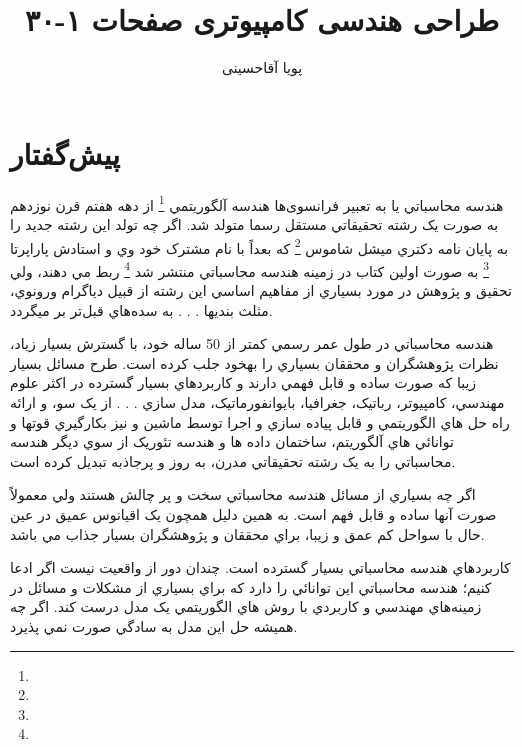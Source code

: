 \documentclass{book}
\author{پویا آقاحسینی}
\title{طراحی هندسی کامپیوتری صفحات ۱-۳۰}
\begin{document}
	\maketitle
	\tableofcontents
	\listoffigures
	\listoftables
	\chapter*{پیش‌گفتار}
	\begin{flushright}
		
		هندسه محاسباتي يا به تعبير فرانسوی‌ها هندسه آلگوريتمي 
		\footnote{}
		از دهه هفتم قرن نوزدهم به صورت يک رشته تحقيقاتي مستقل رسما متولد شد. اگر چه تولد اين رشته جديد را به پايان نامه دکتري ميشل شاموس
		\footnote{}
		که بعداً با نام مشترک خود وي و
		استادش پاراپرتا
		\footnote{}
		به صورت اولين کتاب در زمينه هندسه محاسباتي منتشر شد
		\footnote{}
		ربط مي دهند، ولي تحقيق و پژوهش در مورد
		بسياري از مفاهيم اساسي اين رشته از قبيل دياگرام ورونوي، مثلث بنديها . . . به سده‌هاي قبل‌تر بر ميگردد.
\end{flushright}
	\begin{flushright}
	
	هندسه محاسباتي در طول عمر رسمي کمتر از 50 ساله خود، با گسترش بسيار زياد، نظرات پژوهشگران و محققان بسياري را
	بهخود جلب کرده است. طرح مسائل بسيار زيبا که صورت ساده و قابل فهمي دارند و کاربردهاي بسيار گسترده در اکثر علوم
	مهندسي، کامپيوتر، رباتيک، جغرافيا، بايوانفورماتيک، مدل سازي . . . از يک سو، و ارائه راه حل هاي الگوريتمي و قابل پياده سازي و اجرا توسط ماشين و نيز بکارگيري قوتها و توانائي هاي آلگوريتم، ساختمان داده ها و هندسه تئوريک از سوي ديگر
	هندسه محاسباتي را به يک رشته تحقيقاتي مدرن، به روز و پرجاذبه تبديل کرده است.
\end{flushright}
	\begin{flushright}
اگر چه بسياري از مسائل هندسه محاسباتي سخت و پر چالش هستند ولي معمولاً صورت آنها ساده و قابل فهم است. به همين دليل همچون يک اقيانوس عميق در عين حال با سواحل کم عمق و زيبا، براي محققان و پژوهشگران بسيار جذاب مي باشد.	
\end{flushright}
	\begin{flushright}
کاربردهاي هندسه محاسباتي بسيار گسترده است. چندان دور از واقعيت نيست اگر ادعا کنيم؛ هندسه محاسباتي اين توانائي را دارد که براي بسياري از مشکلات و مسائل در زمينه‌هاي مهندسي و کاربردي با روش هاي الگوريتمي يک مدل درست کند. اگر چه هميشه حل اين مدل به سادگي صورت نمي پذيرد.\\	
\end{flushright}
\end{document}
